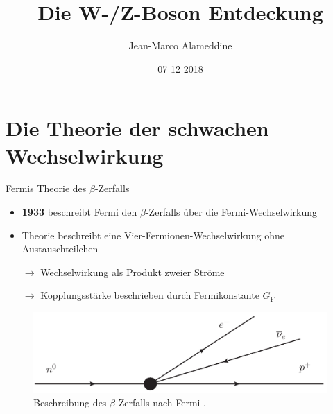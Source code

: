 \documentclass[aspectratio=1610, professionalfonts, 10pt]{beamer}
\title{Die W-/Z-Boson Entdeckung}
\author{Jean-Marco Alameddine}
\institute{TU Dortmund \\ Fakultät Physik}
\date{07 12 2018}
\begin{document}

\begin{frame}
	\maketitle %
\end{frame}

\section{Die Theorie der schwachen Wechselwirkung}

\begin{frame}{Fermis Theorie des $\beta$-Zerfalls}
			\begin{itemize}
				\setlength\itemsep{0.5em}
				\item \textbf{1933} beschreibt Fermi den $\beta$-Zerfalls über die Fermi-Wechselwirkung
				\item Theorie beschreibt eine Vier-Fermionen-Wechselwirkung ohne Austauschteilchen
				\item [$\rightarrow$] Wechselwirkung als Produkt zweier Ströme
				\item [$\rightarrow$] Kopplungsstärke beschrieben durch Fermikonstante $G_\text{F}$
			\end{itemize}

			\begin{figure}
	  			\centering
				\includegraphics[width=0.9\linewidth]{Images/fourFermi_BetaDecay.png}
	  			\caption{Beschreibung des $\beta$-Zerfalls nach Fermi \cite{fermi_four}.}
	  			\label{fig:fermi}
			\end{figure}
\end{frame}
\end{document}
